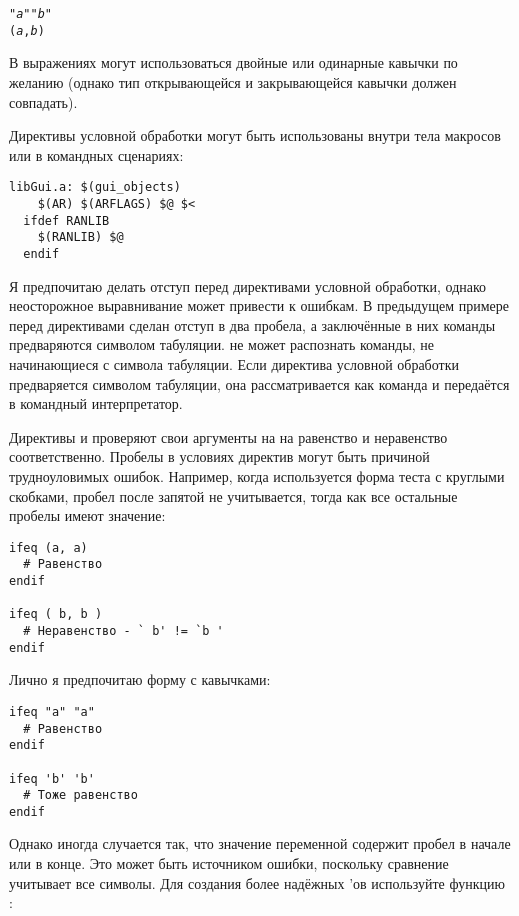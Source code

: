 {\footnotesize
\begin{alltt}
"\emph{a}" "\emph{b}"
(\emph{a},\emph{b})
\end{alltt}
}

В выражениях могут использоваться двойные или одинарные кавычки по
желанию (однако тип открывающейся и закрывающейся кавычки должен
совпадать).

Директивы условной обработки могут быть использованы внутри тела
макросов или в командных сценариях:

{\footnotesize
\begin{verbatim}
libGui.a: $(gui_objects)
    $(AR) $(ARFLAGS) $@ $<
  ifdef RANLIB
    $(RANLIB) $@
  endif
\end{verbatim}
}

Я предпочитаю делать отступ перед директивами условной обработки,
однако неосторожное выравнивание может привести к ошибкам. В
предыдущем примере перед директивами сделан отступ в два пробела, а
заключённые в них команды предваряются символом табуляции. \GNUmake{}
не может распознать команды, не начинающиеся с символа табуляции. Если
директива условной обработки предваряется символом табуляции, она
рассматривается как команда и передаётся в командный интерпретатор.

Директивы  и  проверяют свои
аргументы на на равенство и неравенство соответственно. Пробелы в
условиях директив могут быть причиной трудноуловимых ошибок. Например,
когда используется форма теста с круглыми скобками, пробел после
запятой не учитывается, тогда как все остальные пробелы имеют
значение:

{\footnotesize
\begin{verbatim}
ifeq (a, a)
  # Равенство
endif

ifeq ( b, b )
  # Неравенство - ` b' != `b '
endif
\end{verbatim}
}

Лично я предпочитаю форму с кавычками:

{\footnotesize
\begin{verbatim}
ifeq "a" "a"
  # Равенство
endif

ifeq 'b' 'b'
  # Тоже равенство
endif
\end{verbatim}
}

Однако иногда случается так, что значение переменной содержит пробел в
начале или в конце. Это может быть источником ошибки, поскольку
сравнение учитывает все символы. Для создания более надёжных
\Makefile{}'ов используйте функцию :

